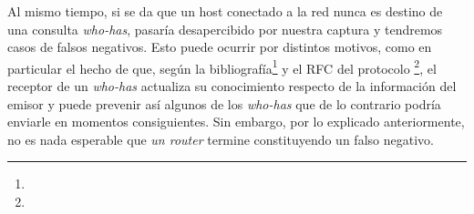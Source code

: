 Al mismo tiempo, si se da que un host conectado a la red nunca es destino de una consulta \textit{who-has}, pasaría desapercibido por nuestra captura y tendremos casos de falsos negativos. Esto puede ocurrir por distintos motivos, como en particular el hecho de que, según la bibliografía\footnote{\peterson} y el RFC del protocolo \footnote{\rfcDeArp}, el receptor de un \textit{who-has} actualiza su conocimiento respecto de la información del emisor y puede prevenir así algunos de los \textit{who-has} que de lo contrario podría enviarle en momentos consiguientes. Sin embargo, por lo explicado anteriormente, no es nada esperable que \textit{un router} termine constituyendo un falso negativo.